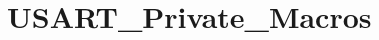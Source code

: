 \hypertarget{group___u_s_a_r_t___private___macros}{\section{U\-S\-A\-R\-T\-\_\-\-Private\-\_\-\-Macros}
\label{group___u_s_a_r_t___private___macros}
}
